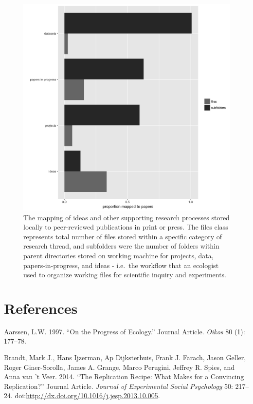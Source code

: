 \documentclass[]{elsarticle} %
\makeatletter
\def\maxwidth{\ifdim\Gin@nat@width>\linewidth\linewidth
\else\Gin@nat@width\fi}
\let\Oldincludegraphics\includegraphics
\renewcommand{\includegraphics}[1]{\Oldincludegraphics[width=\maxwidth]{#1}}
\makeatother
\begin{document}
\begin{figure}
\centering
\includegraphics{./fig2.png}
\caption{The mapping of ideas and other supporting research processes
stored locally to peer-reviewed publications in print or press. The
files class represents total number of files stored within a specific
category of research thread, and subfolders were the number of folders
within parent directories stored on working machine for projects, data,
papers-in-progress, and ideas - i.e.~the workflow that an ecologist used
to organize working files for scientific inquiry and experiments.}
\end{figure}

\section*{References}\label{references}

\hypertarget{refs}{}
\hypertarget{ref-Aarssen1997}{}
Aarssen, L.W. 1997. ``On the Progress of Ecology.'' Journal Article.
\emph{Oikos} 80 (1): 177--78.

\hypertarget{ref-Brandt2014}{}
Brandt, Mark J., Hans Ijzerman, Ap Dijksterhuis, Frank J. Farach, Jason
Geller, Roger Giner-Sorolla, James A. Grange, Marco Perugini, Jeffrey R.
Spies, and Anna van 't Veer. 2014. ``The Replication Recipe: What Makes
for a Convincing Replication?'' Journal Article. \emph{Journal of
Experimental Social Psychology} 50: 217--24.
doi:\href{https://doi.org/http://dx.doi.org/10.1016/j.jesp.2013.10.005}{http://dx.doi.org/10.1016/j.jesp.2013.10.005}.
\end{document}
